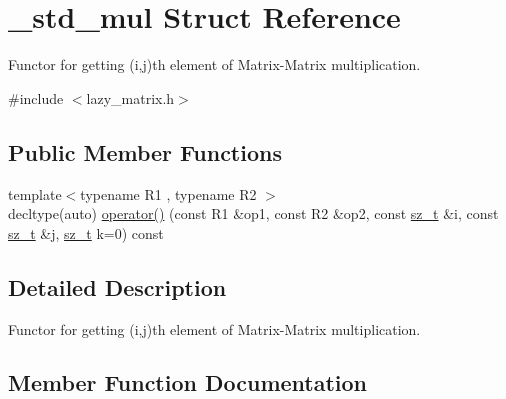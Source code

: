 \hypertarget{struct__std__mul}{}\section{\+\_\+std\+\_\+mul Struct Reference}
\label{struct__std__mul}


Functor for getting (i,j)th element of Matrix-\/\+Matrix multiplication.  




{\ttfamily \#include $<$lazy\+\_\+matrix.\+h$>$}

\subsection*{Public Member Functions}
\begin{DoxyCompactItemize}
\item 
{\footnotesize template$<$typename R1 , typename R2 $>$ }\\decltype(auto) \mbox{\hyperlink{struct__std__mul_a1a0d6c312b897807d1d9f2a040453118}{operator()}} (const R1 \&op1, const R2 \&op2, const \mbox{\hyperlink{lazy__matrix_8h_acba2745dcfc55b2d05ff45adc6a0a015}{sz\+\_\+t}} \&i, const \mbox{\hyperlink{lazy__matrix_8h_acba2745dcfc55b2d05ff45adc6a0a015}{sz\+\_\+t}} \&j, \mbox{\hyperlink{lazy__matrix_8h_acba2745dcfc55b2d05ff45adc6a0a015}{sz\+\_\+t}} k=0) const
\end{DoxyCompactItemize}


\subsection{Detailed Description}
Functor for getting (i,j)th element of Matrix-\/\+Matrix multiplication. 

\subsection{Member Function Documentation}
\mbox{\label{struct__std__mul_a1a0d6c312b897807d1d9f2a040453118}} 
